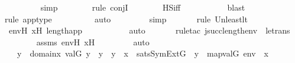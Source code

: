 \begin{isabellebody}
\ \ \ \ \ \ \ \isamarkupfalse%
\ simp\isanewline
\ \ \ \ \ \ \ \isamarkupfalse%
{\isacharparenleft}{\kern0pt}rule\ conjI{\isacharparenright}{\kern0pt}\isanewline
\ \ \ \ \ \ \isamarkupfalse%
\ HS{\isacharunderscore}{\kern0pt}iff\ \isanewline
\ \ \ \ \ \ \ \ \isamarkupfalse%
\ blast\isanewline
\ \ \ \ \ \ \ \isamarkupfalse%
{\isacharparenleft}{\kern0pt}rule\ app{\isacharunderscore}{\kern0pt}type{\isacharparenright}{\kern0pt}\isanewline
\ \ \ \ \ \ \ \ \isamarkupfalse%
\ auto{\isacharbrackleft}{\kern0pt}{}{\isacharbrackright}{\kern0pt}\isanewline
\ \ \ \ \ \ \ \isamarkupfalse%
\ simp\isanewline
\ \ \ \ \ \ \isamarkupfalse%
{\isacharparenleft}{\kern0pt}rule\ Un{\isacharunderscore}{\kern0pt}least{\isacharunderscore}{\kern0pt}lt{\isacharparenright}{\kern0pt}{\isacharplus}{\kern0pt}\isanewline
\ \ \ \ \ \ \isamarkupfalse%
\ env{\isacharprime}{\kern0pt}H\ x{\isacharprime}{\kern0pt}H\ length{\isacharunderscore}{\kern0pt}app\ \isanewline
\ \ \ \ \ \ \ \ \isamarkupfalse%
\ auto{\isacharbrackleft}{\kern0pt}{}{\isacharbrackright}{\kern0pt}\isanewline
\ \ \ \ \ \ \isamarkupfalse%
{\isacharparenleft}{\kern0pt}rule{\isacharunderscore}{\kern0pt}tac\ j{\isacharequal}{\kern0pt}{\isachardoublequoteopen}succ{\isacharparenleft}{\kern0pt}length{\isacharparenleft}{\kern0pt}env{\isacharparenright}{\kern0pt}{\isacharparenright}{\kern0pt}{\isachardoublequoteclose}\ \ le{\isacharunderscore}{\kern0pt}trans{\isacharparenright}{\kern0pt}\isanewline
\ \ \ \ \ \ \isamarkupfalse%
\ assms\ env{\isacharprime}{\kern0pt}H\ x{\isacharprime}{\kern0pt}H\ \isanewline
\ \ \ \ \ \ \isamarkupfalse%
\ auto\isanewline
\ \ \ \ \isamarkupfalse%
\ \isamarkupfalse%
\ {\isachardoublequoteopen}{\isachardot}{\kern0pt}{\isachardot}{\kern0pt}{\isachardot}{\kern0pt}\ {\isasymlongleftrightarrow}\ {\isacharparenleft}{\kern0pt}{\isasymexists}y{\isacharprime}{\kern0pt}\ {\isasymin}\ domain{\isacharparenleft}{\kern0pt}x{\isacharprime}{\kern0pt}{\isacharparenright}{\kern0pt}{\isachardot}{\kern0pt}\ val{\isacharparenleft}{\kern0pt}G{\isacharcomma}{\kern0pt}\ y{\isacharprime}{\kern0pt}{\isacharparenright}{\kern0pt}\ {\isacharequal}{\kern0pt}\ y\ {\isasymand}\ y\ {\isasymin}\ x\ {\isasymand}\ sats{\isacharparenleft}{\kern0pt}SymExt{\isacharparenleft}{\kern0pt}G{\isacharparenright}{\kern0pt}{\isacharcomma}{\kern0pt}\ {\isasymphi}{\isacharcomma}{\kern0pt}\ {\isacharbrackleft}{\kern0pt}y{\isacharbrackright}{\kern0pt}\ {\isacharat}{\kern0pt}\ map{\isacharparenleft}{\kern0pt}val{\isacharparenleft}{\kern0pt}G{\isacharparenright}{\kern0pt}{\isacharcomma}{\kern0pt}\ env{\isacharprime}{\kern0pt}\ {\isacharat}{\kern0pt}\ {\isacharbrackleft}{\kern0pt}x{\isacharprime}{\kern0pt}{\isacharbrackright}{\kern0pt}{\isacharparenright}{\kern0pt}{\isacharparenright}{\kern0pt}{\isacharparenright}{\kern0pt}{\isachardoublequoteclose}\isanewline

\end{isabellebody}
